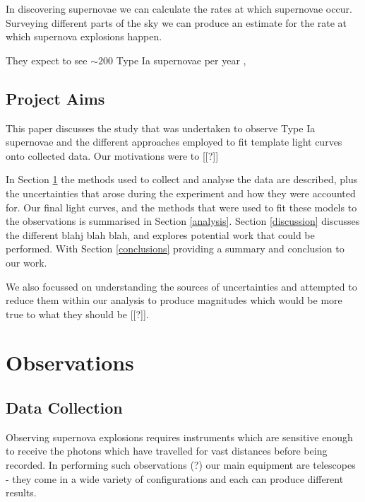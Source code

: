\documentclass[twocolumn]{revtex4}
\begin{document}
In discovering supernovae we can calculate the rates at which supernovae occur. Surveying different parts of the sky we can produce an estimate for the rate at which supernova explosions happen.

They expect to see $\sim 200$ Type Ia supernovae per year \cite{assasn-rev}, 

\vspace{-3ex}
\subsection{Project Aims}
\vspace{-2ex}
This paper discusses the study that was undertaken to observe Type Ia supernovae and the different approaches employed to fit template light curves onto collected data. Our motivations were to [[?]]

In Section \ref{obsver} the methods used to collect and analyse the data are described, plus the uncertainties that arose during the experiment and how they were accounted for. Our final light curves, and the methods that were used to fit these models to the observations is summarised in Section \ref{analysis}. Section \ref{discussion} discusses the different blahj blah blah, and explores potential work that could be performed. With Section \ref{conclusions} providing a summary and conclusion to our work.

We also focussed on understanding the sources of uncertainties and attempted to reduce them within our analysis to produce magnitudes which would be more true to what they should be [[?]]. 


\vspace{-3ex}
\section{Observations} 
\label{obsver}
\vspace{-2ex}
\subsection{Data Collection}
\vspace{-2ex}

Observing supernova explosions requires instruments which are sensitive enough to receive the photons which have travelled for vast distances before being recorded. In performing such observations (?) our main equipment are telescopes - they come in a wide variety of configurations and each can produce different results.
\end{document}
